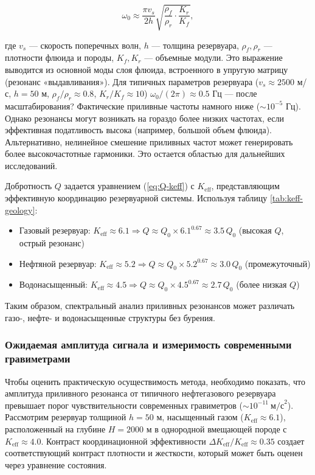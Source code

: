 \documentclass[12pt,a4paper]{article}
\theoremstyle{remark}
\newcommand{\Keff}{K_{\mathrm{eff}}}
\begin{document}
	\begin{equation}
		\omega_0 \approx \frac{\pi v_s}{2h} \sqrt{\frac{\rho_f}{\rho_r} \cdot \frac{K_r}{K_f}},
		\label{eq:resonant-frequency}
	\end{equation}
	
	где $v_s$ — скорость поперечных волн, $h$ — толщина резервуара, $\rho_f, \rho_r$ — плотности флюида и породы, $K_f, K_r$ — объемные модули. Это выражение выводится из основной моды слоя флюида, встроенного в упругую матрицу (резонанс «выдавливания»). Для типичных параметров резервуара ($v_s \approx 2500$ м/с, $h = 50$ м, $\rho_f/\rho_r \approx 0.8$, $K_r/K_f \approx 10$) $\omega_0/(2\pi) \approx 0.5$ Гц — после масштабирования? Фактические приливные частоты намного ниже ($\sim 10^{-5}$ Гц). Однако резонансы могут возникать на гораздо более низких частотах, если эффективная податливость высока (например, большой объем флюида). Альтернативно, нелинейное смешение приливных частот может генерировать более высокочастотные гармоники. Это остается областью для дальнейших исследований.
	
	Добротность $Q$ задается уравнением (\ref{eq:Q-keff}) с $\Keff$, представляющим эффективную координацию резервуарной системы. Используя таблицу \ref{tab:keff-geology}:
	
	\begin{itemize}
		\item Газовый резервуар: $\Keff \approx 6.1 \Rightarrow Q \approx Q_0 \times 6.1^{0.67} \approx 3.5\,Q_0$ (высокая $Q$, острый резонанс)
		\item Нефтяной резервуар: $\Keff \approx 5.2 \Rightarrow Q \approx Q_0 \times 5.2^{0.67} \approx 3.0\,Q_0$ (промежуточный)
		\item Водонасыщенный: $\Keff \approx 4.5 \Rightarrow Q \approx Q_0 \times 4.5^{0.67} \approx 2.7\,Q_0$ (более низкая $Q$)
	\end{itemize}
	
	Таким образом, спектральный анализ приливных резонансов может различать газо-, нефте- и водонасыщенные структуры без бурения.
	
	\subsubsection{Ожидаемая амплитуда сигнала и измеримость современными гравиметрами}
	\label{subsubsec:signal_amplitude}
	
	Чтобы оценить практическую осуществимость метода, необходимо показать, что амплитуда приливного резонанса от типичного нефтегазового резервуара превышает порог чувствительности современных гравиметров (\( \sim 10^{-11}\ \text{м/с}^2\)). Рассмотрим резервуар толщиной \(h = 50\) м, насыщенный газом (\(\Keff \approx 6.1\)), расположенный на глубине \(H = 2000\) м в однородной вмещающей породе с \(\Keff \approx 4.0\). Контраст координационной эффективности \(\Delta \Keff / \Keff \approx 0.35\) создает соответствующий контраст плотности и жесткости, который может быть оценен через уравнение состояния.
	
\end{document}
